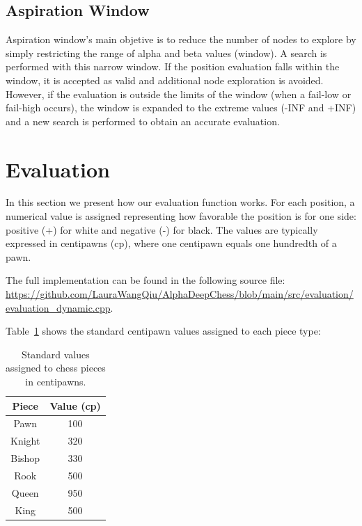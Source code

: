\subsection*{Aspiration Window}

Aspiration window's main objetive is to reduce the number of nodes to explore by simply restricting the range of alpha and beta values (window). A search is performed with this narrow window. If the position evaluation falls within the window, it is accepted as valid and additional node exploration is avoided. However, if the evaluation is outside the limits of the window (when a fail-low or fail-high occurs), the window is expanded to the extreme values (-INF and +INF) and a new search is performed to obtain an accurate evaluation. ~\cite{AspirationWindow}

\newpage

\section{Evaluation}
\label{sec:evaluation}

In this section we present how our evaluation function works. For each position, a numerical value is assigned representing how favorable the position is for one side: positive (+) for white and negative (-) for black. The values are typically expressed in centipawns (cp), where one centipawn equals one hundredth of a pawn. ~\cite{Shannon1950}

\vspace{1em}

\noindent The full implementation can be found in the following source file: \\
\scriptsize\url{https://github.com/LauraWangQiu/AlphaDeepChess/blob/main/src/evaluation/evaluation_dynamic.cpp}\normalsize.

\vspace{2em}

\noindent Table~\ref{tab:piece-values} shows the standard centipawn values assigned to each piece type:

\begin{table}[H]
    \centering
    \begin{tabular}{|c|c|}
        \hline
        Piece & Value (cp)\\ \hline
        Pawn & 100 \\ \hline
        Knight & 320 \\ \hline
        Bishop & 330 \\ \hline
        Rook & 500 \\ \hline
        Queen & 950 \\ \hline
        King & 500 \\ \hline
    \end{tabular}
    \caption{Standard values assigned to chess pieces in centipawns.}
    \label{tab:piece-values}
\end{table}


